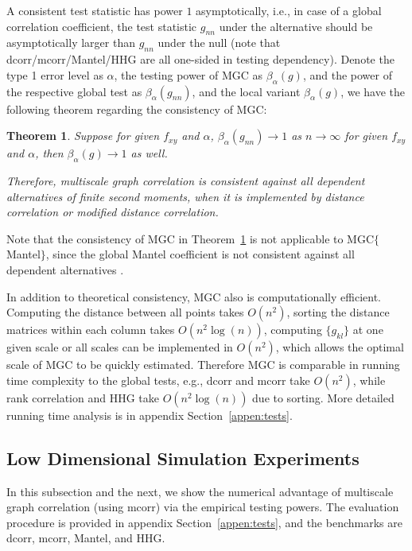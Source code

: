 \documentclass[11pt]{article}
\newtheorem{thm}{Theorem}
\begin{document}
A consistent test statistic has power $1$ asymptotically, i.e., in case of a global correlation coefficient, the test statistic $g_{nn}$ under the alternative should be asymptotically larger than $g_{nn}$ under the null (note that dcorr/mcorr/Mantel/HHG are all one-sided in testing dependency). Denote the type 1 error level as $\alpha$, the testing power of MGC as $\beta_{\alpha}(g)$, and the power of the respective global test as $\beta_{\alpha}(g_{nn})$, and the local variant $\beta_{\alpha}(g)$, we have the following theorem regarding the consistency of MGC:
\begin{thm}
\label{thm1}
Suppose for given $f_{xy}$ and $\alpha$, $\beta_{\alpha}(g_{nn}) \rightarrow 1$ as $n \rightarrow \infty$ for given $f_{xy}$ and $\alpha$, then $\beta_{\alpha}(g) \rightarrow 1$ as well.

Therefore, multiscale graph correlation is consistent against all dependent alternatives of finite second moments, when it is implemented by distance correlation or modified distance correlation.
\end{thm}

Note that the consistency of MGC in Theorem~\ref{thm1} is not applicable to MGC$\{$Mantel$\}$, since the global Mantel coefficient is not consistent against all dependent alternatives \cite{JosseHolmes2013}. 

In addition to theoretical consistency, MGC also is computationally efficient. Computing the distance between all points takes $O(n^2)$, sorting the distance matrices within each column takes $O(n^2\log(n))$, computing $\{g_{kl}\}$ at one given scale or all scales can be implemented in $O(n^2)$, which allows the optimal scale of MGC to be quickly estimated. Therefore MGC is comparable in running time complexity to the global tests, e.g., dcorr and mcorr take $O(n^2)$, while rank correlation and HHG take $O(n^2\log(n))$ due to sorting. More detailed running time analysis is in appendix Section~\ref{appen:tests}.


\subsection{Low Dimensional Simulation Experiments}
\label{numer1}
In this subsection and the next, we show the numerical advantage of multiscale graph correlation (using mcorr) via the empirical testing powers. The evaluation procedure is provided in appendix Section~\ref{appen:tests}, and the benchmarks are dcorr, mcorr, Mantel, and HHG.
\end{document}
